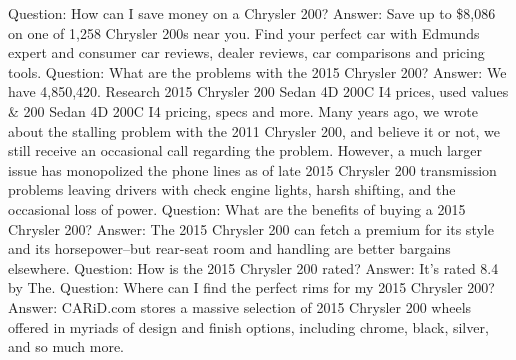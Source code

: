 \documentclass[table]{article}
\begin{document}
\begin{tcolorbox}[colback=gray!20, colframe=gray!75, rounded corners, sharp corners=northeast, sharp corners=southwest]
{Question: How can I save money on a Chrysler 200? Answer: Save up to \$8,086 on one of 1,258 Chrysler 200s near you. Find your perfect car with Edmunds expert and consumer car reviews, dealer reviews, car comparisons and pricing tools. Question: What are the problems with the 2015 Chrysler 200? Answer: We have 4,850,420. Research 2015 Chrysler 200 Sedan 4D 200C I4 prices, used values \& 200 Sedan 4D 200C I4 pricing, specs and more. Many years ago, we wrote about the stalling problem with the 2011 Chrysler 200, and believe it or not, we still receive an occasional call regarding the problem. However, a much larger issue has monopolized the phone lines as of late 2015 Chrysler 200 transmission problems leaving drivers with check engine lights, harsh shifting, and the occasional loss of power. Question: What are the benefits of buying a 2015 Chrysler 200? Answer: The 2015 Chrysler 200 can fetch a premium for its style and its horsepower--but rear-seat room and handling are better bargains elsewhere. Question: How is the 2015 Chrysler 200 rated? Answer: It's rated 8.4 by The. Question: Where can I find the perfect rims for my 2015 Chrysler 200? Answer: CARiD.com stores a massive selection of 2015 Chrysler 200 wheels offered in myriads of design and finish options, including chrome, black, silver, and so much more.}
\end{tcolorbox}
\end{document}
